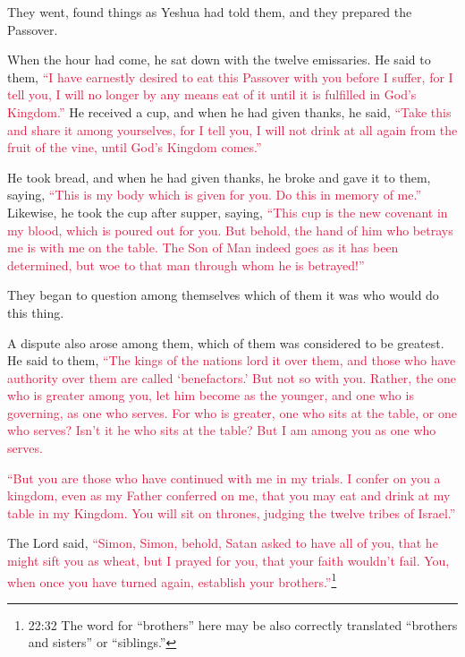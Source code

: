 \myverse{}They went, found things as Yeshua had told them, and they prepared
the Passover.

\myverse{}When the hour had come, he sat down with the twelve emissaries.
\myverse{}He said to them,
\textcolor{crimson}{“I have earnestly desired to eat this Passover with you before I suffer,
}
\myverse{}\textcolor{crimson}{for I tell you, I will no longer by any means eat of it until it is fulfilled
	in God’s Kingdom.”}
\myverse{}He received a cup, and when he had given thanks, he said,
\textcolor{crimson}{“Take this and share it among yourselves,
}
\myverse{}\textcolor{crimson}{for I tell you, I will not drink at all again from the fruit of the vine,
	until God’s Kingdom comes.”}

\myverse{}He took bread, and when he had given thanks, he broke and gave
it to them, saying,
\textcolor{crimson}{“This is my body which is given for you. Do this in memory of me.”}
\myverse{}Likewise, he took the cup after supper, saying,
\textcolor{crimson}{“This cup is the new covenant in my blood, which is poured out for you.
}
\myverse{}\textcolor{crimson}{But behold, the hand of him who betrays me is with me on the table.
}
\myverse{}\textcolor{crimson}{The Son of Man indeed goes as it has been determined, but woe to that
	man through whom he is betrayed!”}

\myverse{}They began to question among themselves which of them it was
who would do this thing.

\myverse{}A dispute also arose among them, which of them was considered
to be greatest.
\myverse{}He said to them,
\textcolor{crimson}{“The kings of the nations lord it over them, and those who have authority over them are called ‘benefactors.’
}
\myverse{}\textcolor{crimson}{But not so with you. Rather, the one who is greater among you, let him
	become as the younger, and one who is governing, as one who serves.
}
\myverse{}\textcolor{crimson}{For who is greater, one who sits at the table, or one who serves? Isn’t
	it he who sits at the table? But I am among you as one who serves.
}

\myverse{}\textcolor{crimson}{“But you are those who have continued with me in my trials.
}
\myverse{}\textcolor{crimson}{I confer on you a kingdom, even as my Father conferred on me,
}
\myverse{}\textcolor{crimson}{that you may eat and drink at my table in my Kingdom. You will sit on
	thrones, judging the twelve tribes of Israel.”}

\myverse{}The Lord said, \textcolor{crimson}{“Simon, Simon, behold, Satan asked to have all of you, that he might sift you as wheat,} \myverse{}\textcolor{crimson}{but I prayed for you, that your faith wouldn’t fail. You, when once you have turned again, establish your brothers.”}\footnote{22:32 The word for “brothers” here may be also correctly translated “brothers and sisters” or “siblings.”}

